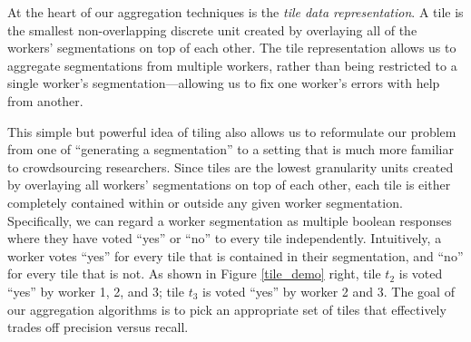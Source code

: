At the heart of our aggregation techniques is the \emph{tile data representation}. A tile is the smallest non-overlapping discrete unit created by overlaying all of the workers' segmentations on top of each other. %
The tile representation allows us to aggregate segmentations from multiple workers, rather than being restricted to a single worker's segmentation---allowing us to fix one worker's errors with help from another. 
\par This simple but powerful idea of tiling also allows us to reformulate our problem from one of ``generating a segmentation'' to a setting that is much more familiar to crowdsourcing researchers. Since tiles are the lowest granularity units created by overlaying all workers' segmentations on top of each other, each tile is either completely contained within or outside any given worker segmentation. Specifically, we can regard a worker segmentation as multiple boolean responses where they have voted ``yes'' or ``no'' to every tile independently. Intuitively, a worker votes ``yes'' for every tile that is contained in their segmentation, and ``no'' for every tile that is not. As shown in Figure \ref{tile_demo} right, tile $t_2$ is voted ``yes'' by worker 1, 2, and 3; tile $t_3$ is voted ``yes'' by worker 2 and 3. The goal of our aggregation algorithms is to pick an appropriate set of tiles that effectively trades off precision versus recall.
